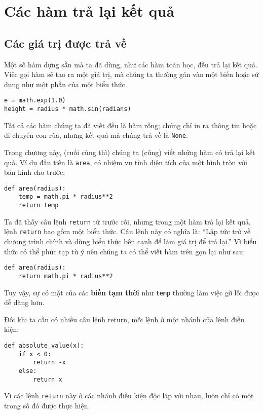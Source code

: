 \documentclass[11pt]{book}
\begin{document}
\chapter{Các hàm trả lại kết quả}
\label{fruitchap}

\section{Các giá trị được trả về}

Một số hàm dựng sẵn mà ta đã dùng, như các hàm toán học,
đều trả lại kết quả. Việc gọi hàm sẽ tạo ra một giá trị, mà chúng
ta thường gán vào một biến hoặc sử dụng như một phần của
một biểu thức.

\beforeverb
\begin{verbatim}
e = math.exp(1.0)
height = radius * math.sin(radians)
\end{verbatim}
\afterverb
%
Tất cả các hàm chúng ta đã viết đều là hàm rỗng; chúng chỉ
in ra thông tin hoặc di chuyển con rùa, nhưng kết quả mà
chúng trả về là {\tt None}.

Trong chương này, (cuối cùng thì) chúng ta (cũng) viết những
hàm có trả lại kết quả. Ví dụ đầu tiên là {\tt area}, có nhiệm 
vụ tính diện tích của một hình tròn với bán kính cho trước:

\beforeverb
\begin{verbatim}
def area(radius):
    temp = math.pi * radius**2
    return temp
\end{verbatim}
\afterverb
%
Ta đã thấy câu lệnh {\tt return} từ trước rồi, nhưng trong một
hàm trả lại kết quả, lệnh {\tt return} bao gồm một biểu thức.
Câu lệnh này có nghĩa là: ``Lập tức trở về chương trình chính
và dùng biểu thức bên cạnh để làm giá trị để trả lại.''
Vì biểu thức có thể phức tạp tù ý nên chúng ta có thể viết
hàm trên gọn lại như sau:


\beforeverb
\begin{verbatim}
def area(radius):
    return math.pi * radius**2
\end{verbatim}
\afterverb
%
Tuy vậy, sự có mặt của các {\bf biến tạm thời} như {\tt temp} 
thường làm việc gỡ lỗi được dễ dàng hơn.


Đôi khi ta cần có nhiều câu lệnh return, mỗi lệnh ở một nhánh của 
lệnh điều kiện:

\beforeverb
\begin{verbatim}
def absolute_value(x):
    if x < 0:
        return -x
    else:
        return x
\end{verbatim}
\afterverb
%
Vì các lệnh {\tt return} này ở các nhánh điều kiện độc lập với nhau,
luôn chỉ có một trong số đó được thực hiện.
\end{document}
